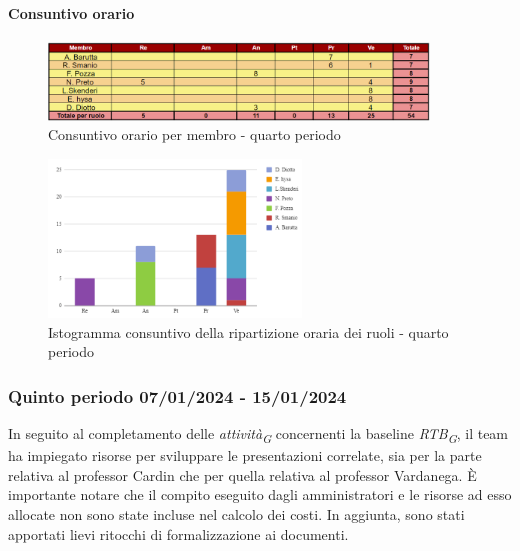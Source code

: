 \paragraph*{Consuntivo orario } \hspace{1pt}

\begin{figure}[H]
    \centering
    \includegraphics[width=0.9\textwidth]{../Images/consuntivoOrario4Periodo.png}
    \caption{Consuntivo orario per membro - quarto periodo}
    \label{fig:Constuntivo_orario_4}
\end{figure}

\begin{figure}[H]
    \centering
    \includegraphics[width=0.6\textwidth]{../Images/consuntivoDivisioneRuoli4Periodo.png}
    \caption{Istogramma consuntivo della ripartizione oraria dei ruoli - quarto periodo}
    \label{fig:Consuntivo_ripartizione_oraria_4}
\end{figure}



\subsubsection{Quinto periodo  07/01/2024 - 15/01/2024}
In seguito al completamento delle \textit{attività}\textsubscript{\textit{G}} concernenti la baseline \textit{RTB}\textsubscript{\textit{G}}, il team ha impiegato risorse per sviluppare le presentazioni correlate, sia per la parte relativa al professor Cardin che per quella relativa al professor Vardanega.
È importante notare che il compito eseguito dagli amministratori e le risorse ad esso allocate non sono state incluse nel calcolo dei costi. 
In aggiunta, sono stati apportati lievi ritocchi di formalizzazione ai documenti.

